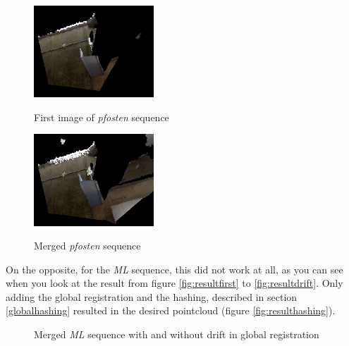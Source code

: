 \documentclass[10pt,twocolumn,letterpaper]{article}
\begin{document}
\begin{figure}
  \includegraphics[width=0.4\textwidth]{pfostenstart}
  \label{fig:pfostenstart}
  \caption{First image of \textit{pfosten} sequence}
\end{figure}

\begin{figure}
  \centering
  \includegraphics[width=0.4\textwidth]{pfostenend}
  \label{fig:pfostenend}
  \caption{Merged \textit{pfosten} sequence}
\end{figure}

On the opposite, for the \textit{ML} sequence, this did not work at all, as you can see when you look at the result from figure
\ref{fig:resultfirst} to \ref{fig:resultdrift}. Only adding the global registration and the hashing, described in section \ref{globalhashing}
resulted in the desired pointcloud (figure \ref{fig:resulthashing}).

\begin{figure}
  \centering
  \caption{Merged \textit{ML} sequence with and without drift in global registration}
  \label{fig:globalregistration}
\end{figure}
\end{document}
